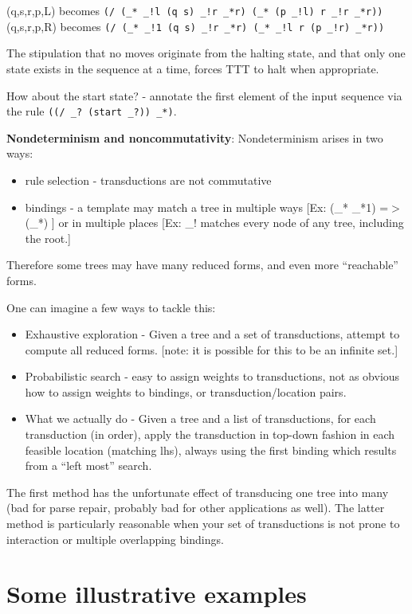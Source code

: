 \documentclass[11pt]{article}
\begin{document}
(q,s,r,p,L) becomes \texttt{(/ (\_* \_!l (q s) \_!r \_*r) (\_* (p \_!l) r \_!r \_*r))}
(q,s,r,p,R) becomes \texttt{(/ (\_* \_!1 (q s) \_!r \_*r) (\_* \_!l r (p \_!r) \_*r))}

The stipulation that no moves originate from the halting state, and that only one state exists in the sequence at a time, forces TTT to halt when appropriate.

How about the start state? - annotate the first element of the input sequence via the rule \texttt{((/ \_? (start \_?)) \_*)}.




{\bf Nondeterminism and noncommutativity}:
  Nondeterminism arises in two ways:
  \begin{itemize}
  \item rule selection - transductions are not commutative
  \item bindings  - a template may match a tree in multiple ways  [Ex: (\_* \_*1) =$>$ (\_*) ] or in multiple places [Ex: \_! matches every node of any tree, including the root.]
  \end{itemize}
  Therefore some trees may have many reduced forms, and even more ``reachable'' forms. 
  
  One can imagine a few ways to tackle this: 
  \begin{itemize}
  \item Exhaustive exploration - Given a tree and a set of transductions, attempt to compute all reduced forms.   [note: it is possible for this to be an infinite set.]
  \item Probabilistic search - easy to assign weights to transductions, not as obvious how to assign weights to bindings, or transduction/location pairs. 
  \item What we actually do - Given a tree and a list of transductions, for each transduction (in order), apply the transduction in top-down fashion in each feasible location (matching lhs), always using the first binding which results from a ``left most'' search.
  \end{itemize}
  The first method has the unfortunate effect of transducing one tree into many (bad for parse repair, probably bad for other applications as well).
  The latter method is particularly reasonable when your set of transductions is not prone to interaction or multiple overlapping bindings.



\section{Some illustrative examples}
\end{document}
